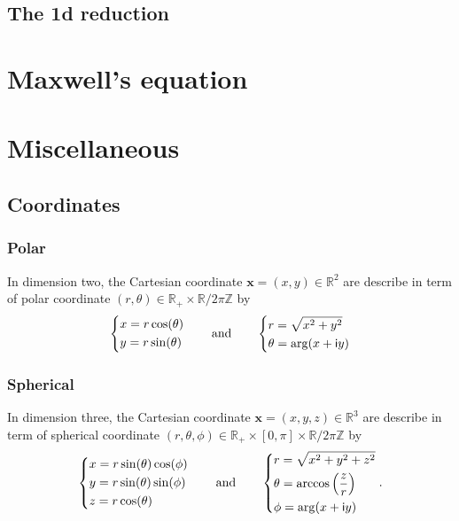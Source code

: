 \documentclass[12pt,a4paper]{article}
\newcommand{\bbR}{\mathbb{R}}
\newcommand{\bbZ}{\mathbb{Z}}
\newcommand{\im}{\mathsf{i}}
\newcommand{\plr}[1]{\left(#1\right)}
\newcommand{\vx}{\boldsymbol{x}}
\begin{document}
\subsection{The 1d reduction}

\section{Maxwell's equation}

\appendix

\section{Miscellaneous}

\subsection{Coordinates}

%
\subsubsection{Polar}
%

In dimension two, the Cartesian coordinate $\vx = (x, y) \in \bbR^2$ are describe in term of polar coordinate $(r, \theta) \in \bbR_+ \times \bbR / 2\pi\bbZ$ by
\[
    \begin{dcases}
        x = r \cos(\theta)\\
        y = r \sin(\theta)
    \end{dcases} \qquad
    \text{and} \qquad
    \begin{dcases}
        r = \sqrt{x^2 + y^2}\\
        \theta = \arg(x + \im y)
    \end{dcases}
\]

%
\subsubsection{Spherical}
%

In dimension three, the Cartesian coordinate $\vx = (x, y, z) \in \bbR^3$ are describe in term of spherical coordinate $(r, \theta, \phi) \in \bbR_+ \times [0, \pi] \times \bbR / 2\pi\bbZ$ by
\[
    \begin{dcases}
        x = r \sin(\theta) \cos(\phi)\\
        y = r \sin(\theta) \sin(\phi)\\
        z = r \cos(\theta)
    \end{dcases} \qquad
    \text{and} \qquad
    \begin{dcases}
        r = \sqrt{x^2 + y^2 + z^2}\\
        \theta = \arccos\plr{\frac{z}{r}}\\
        \phi = \arg(x + \im y)
    \end{dcases}.
\]
\end{document}
